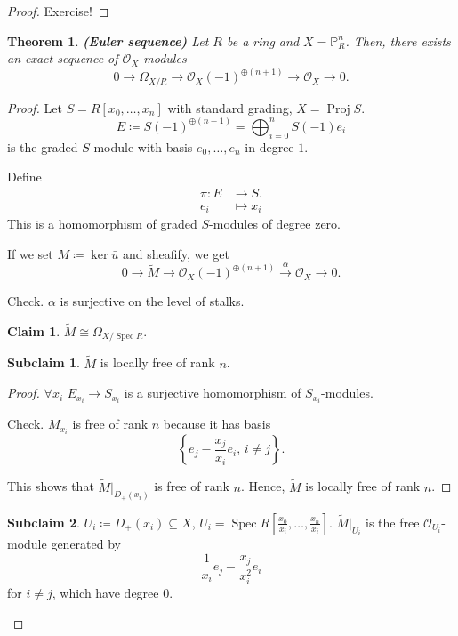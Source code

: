 \documentclass[12pt]{article}
\DeclareMathOperator{\Spec}{Spec}
\DeclareMathOperator{\Proj}{Proj}
\newtheorem*{theorem}{Theorem}
\theoremstyle{definition}
\newtheorem*{claim}{Claim}
\newtheorem{subclaim}{Subclaim}
\begin{document}
\begin{proof}
Exercise!
\end{proof}

\begin{theorem}
\emph{\textbf{(Euler sequence)}} Let $R$ be a ring and $X=\mathbb P_R^n$. Then, there exists an exact sequence of $\mathcal O_X$-modules
\[0\longrightarrow\Omega_{X/R}\longrightarrow\mathcal O_X(-1)^{\oplus(n+1)}\longrightarrow\mathcal O_X\longrightarrow0.\]
\end{theorem}

\begin{proof}
Let $S=R[x_0,\ldots,x_n]$ with standard grading, $X=\Proj S$.
\[E\coloneqq S(-1)^{\oplus(n-1)}=\bigoplus_{i=0}^nS(-1)e_i\]
is the graded $S$-module with basis $e_0,\ldots,e_n$ in degree $1$.

Define
\begin{align*}
\pi:E&\longrightarrow S.\\e_i&\longmapsto x_i
\end{align*}
This is a homomorphism of graded $S$-modules of degree zero.

If we set $M\coloneqq\ker\bar u$ and sheafify, we get
\[0\longrightarrow\widetilde M\longrightarrow\mathcal O_X(-1)^{\oplus(n+1)}\overset\alpha\longrightarrow\mathcal O_X\longrightarrow0.\]

Check. $\alpha$ is surjective on the level of stalks.

\begin{claim}
$\widetilde M\cong\Omega_{X/\Spec R}$.
\end{claim}

\begin{subclaim}
$\widetilde M$ is locally free of rank $n$.
\end{subclaim}

\begin{proof}
$\forall x_i$ $E_{x_i}\rightarrow S_{x_i}$ is a surjective homomorphism of $S_{x_i}$-modules.

Check. $M_{x_i}$ is free of rank $n$ because it has basis
\[\left\{e_j-\frac{x_j}{x_i}e_i,\,i\neq j\right\}.\]

This shows that $\widetilde M|_{D_+(x_i)}$ is free of rank $n$. Hence, $\widetilde M$ is locally free of rank $n$.
\end{proof}

\begin{subclaim}
$U_i\coloneqq D_+(x_i)\subseteq X$, $U_i=\Spec R[\frac{x_0}{x_i},\ldots,\frac{x_n}{x_i}]$. $\widetilde M|_{U_i}$ is the free $\mathcal O_{U_i}$-module generated by
\[\frac1{x_i}e_j-\frac{x_j}{x_i^2}e_i\]
for $i\neq j$, which have degree 0.
\end{subclaim}


\end{proof}
\end{document}

